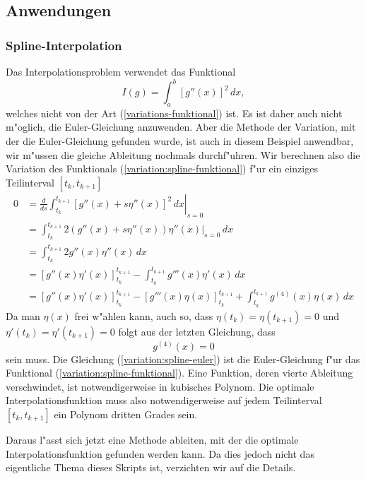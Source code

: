 \subsection{Anwendungen}
\subsubsection{Spline-Interpolation}
Das Interpolationsproblem verwendet das Funktional
\begin{equation}
I(g)=
\int_a^b[g''(x)]^2\,dx,
\label{variation:spline-funktional}
\end{equation}
welches nicht von der Art (\ref{variations-funktional}) ist.
Es ist daher auch nicht m"oglich, die Euler-Gleichung anzuwenden.
Aber die Methode der Variation, mit der die Euler-Gleichung gefunden
wurde, ist auch in diesem Beispiel anwendbar, wir m"ussen die gleiche
Ableitung nochmals durchf"uhren.
Wir berechnen also die Variation
des Funktionals
(\ref{variation:spline-funktional})
f"ur ein einziges Teilinterval $[t_k,t_{k+1}]$
\begin{align*}
0&=
\left.
\frac{d}{ds}\int_{t_k}^{t_{k+1}} [g''(x)+s\eta''(x)]^2\,dx
\right|_{s=0}
\\
&=
\int_{t_k}^{t_{k+1}} 2(g''(x)+s\eta''(x))\eta''(x)\bigg|_{s=0}\,dx
\\
&=
\int_{t_k}^{t_{k+1}} 2g''(x)\eta''(x)\,dx
\\
&=
\left[g''(x)\eta'(x)\right]_{t_k}^{t_{k+1}}
-
\int_{t_k}^{t_{k+1}}
g'''(x)\eta'(x)\,dx
\\
&=
\left[g''(x)\eta'(x)\right]_{t_k}^{t_{k+1}}
-
\left[g'''(x)\eta(x)\right]_{t_k}^{t_{k+1}}
+
\int_{t_k}^{t_{k+1}} g^{(4)}(x)\eta(x)\,dx
\end{align*}
Da man $\eta(x)$ frei w"ahlen kann, auch so, dass
$\eta(t_k)=\eta(t_{k+1})=0$
und 
$\eta'(t_k)=\eta'(t_{k+1})=0$
folgt aus der letzten Gleichung, dass
\begin{equation}
g^{(4)}(x)=0
\label{variation:spline-euler}
\end{equation}
sein muss.
Die Gleichung 
(\ref{variation:spline-euler}) ist die Euler-Gleichung f"ur das Funktional
(\ref{variation:spline-funktional}).
Eine Funktion, deren vierte Ableitung verschwindet, ist notwendigerweise in
kubisches Polynom.
Die optimale Interpolationsfunktion muss also notwendigerweise auf jedem
Teilinterval $[t_k,t_{k+1}]$ ein Polynom dritten Grades sein.

Daraus l"asst sich jetzt eine Methode ableiten, mit der die optimale
Interpolationsfunktion gefunden werden kann.
Da dies jedoch nicht das eigentliche Thema dieses Skripts ist,
verzichten wir auf die Details.


